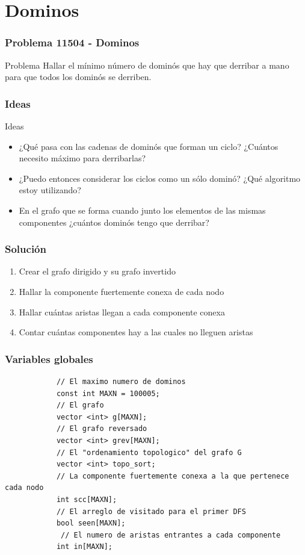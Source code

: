 \documentclass{beamer}
\begin{document}
\section{Dominos}
	\begin{frame}
		\frametitle{Problema 11504 - Dominos}
		\begin{block}{Problema}
			Hallar el mínimo número de dominós que hay que derribar a mano para que todos los dominós se derriben.
		\end{block}
	\end{frame}
	
	\begin{frame}
		\frametitle{Ideas}
		\begin{alertblock}{Ideas}
			\begin{itemize}
				\item ¿Qué pasa con las cadenas de dominós que forman un ciclo? ¿Cuántos necesito máximo para derribarlas? \pause
				\item ¿Puedo entonces considerar los ciclos como un sólo dominó? ¿Qué algoritmo estoy utilizando? \pause
				\item En el grafo que se forma cuando junto los elementos de las mismas componentes ¿cuántos dominós tengo que derribar?
			\end{itemize}
		\end{alertblock}
	\end{frame}
	
	\begin{frame}
		\frametitle{Solución}
		\begin{enumerate}
			\item Crear el grafo dirigido y su grafo invertido
			\item Hallar la componente fuertemente conexa de cada nodo
			\item Hallar cuántas aristas llegan a cada componente conexa
			\item Contar cuántas componentes hay a las cuales no lleguen aristas
		\end{enumerate}
	\end{frame}
	
	\begin{frame}[fragile]
		\frametitle{Variables globales}
		\begin{lstlisting}
			// El maximo numero de dominos
			const int MAXN = 100005; 
			// El grafo
			vector <int> g[MAXN];
			// El grafo reversado    
			vector <int> grev[MAXN];
			// El "ordenamiento topologico" del grafo G 
			vector <int> topo_sort;  
			// La componente fuertemente conexa a la que pertenece cada nodo
			int scc[MAXN];  
			// El arreglo de visitado para el primer DFS         
			bool seen[MAXN];
			 // El numero de aristas entrantes a cada componente         
			int in[MAXN];           
		\end{lstlisting}
	\end{frame}
	
\end{document}
